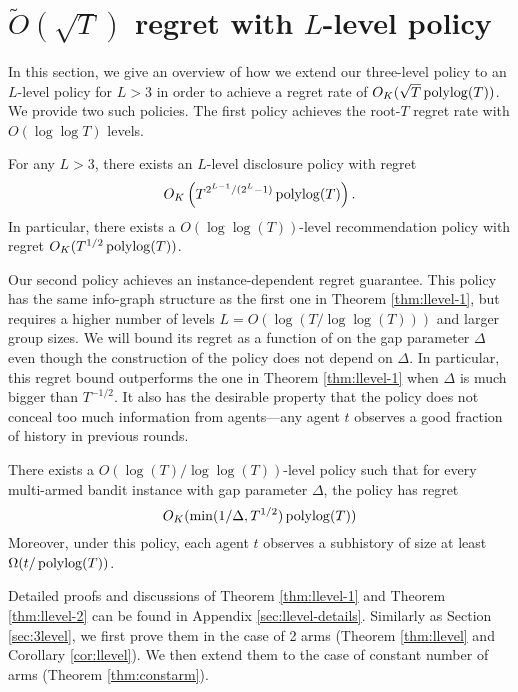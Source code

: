 
\section{$\tilde O(\sqrt{T})$ regret with $L$-level policy}
\label{sec:llevel}
In this section, we give an overview of how we extend our three-level
policy to an $L$-level policy for $L > 3$ in order to achieve a regret
rate of $O_K(\sqrt{T} \polylog(T))$. We provide two such policies. The
first policy achieves the root-$T$ regret rate with $O(\log \log T)$
levels.

\begin{theorem}
\label{thm:llevel-1}
For any $L > 3$, there exists an $L$-level disclosure policy with
regret $$O_K\left(T^{2^{L-1}/(2^L-1)} \polylog(T) \right).$$ In
particular, there exists a $O(\log\log(T))$-level recommendation
policy with regret $O_K(T^{1/2} \polylog(T))$.
\end{theorem}

Our second policy achieves an instance-dependent regret
guarantee. This policy has the same info-graph structure as the first
one in Theorem \ref{thm:llevel-1}, but requires a higher number of
levels $L = O(\log(T/\log\log(T)))$ and larger group sizes. We will
bound its regret as a function of on the gap parameter $\Delta$ even
though the construction of the policy does not depend on $\Delta$. In
particular, this regret bound outperforms the one in Theorem
\ref{thm:llevel-1} when $\Delta$ is much bigger than $T^{-1/2}$.  It
also has the desirable property that the policy does not conceal too
much information from agents---any agent $t$ observes a good fraction
of history in previous rounds.

\begin{theorem}
\label{thm:llevel-2}
There exists a $O(\log(T)/\log\log(T))$-level policy such that for
every multi-armed bandit instance with gap parameter $\Delta$, the
policy has regret $$O_K(\min(1/\Delta, T^{1/2})\polylog(T))$$
Moreover, under this policy, each agent $t$ observes a subhistory of
size at least $\Omega( t/\polylog(T))$.
\end{theorem}

Detailed proofs and discussions of Theorem \ref{thm:llevel-1} and Theorem \ref{thm:llevel-2} can be found in Appendix \ref{sec:llevel-details}. Similarly as Section \ref{sec:3level}, we first prove them in the case of 2 arms (Theorem \ref{thm:llevel} and Corollary \ref{cor:llevel}). We then extend them to the case of constant number of arms (Theorem \ref{thm:constarm}).

